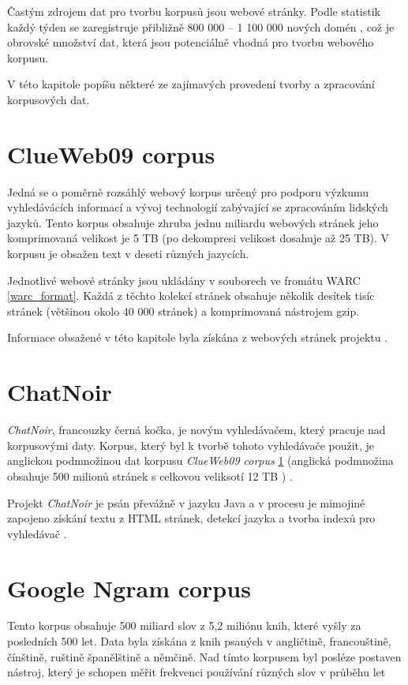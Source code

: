 Častým zdrojem dat pro tvorbu korpusů jsou webové stránky. Podle statistik
každý týden se zaregistruje přibližně 800 000 -- 1 100 000 nových domén \cite{NEWPAGES},
což je obrovské množství dat, která jsou potenciálně vhodná pro tvorbu webového korpusu.

V této kapitole popíšu některé ze zajímavých provedení tvorby a zpracování korpusových dat.

\section{ClueWeb09 corpus}
\label{ClueWeb09}
Jedná se o poměrně rozsáhlý webový korpus určený pro podporu výzkumu vyhledávácích informací
a vývoj technologií zabývající se zpracováním lidských jazyků. Tento korpus obsahuje zhruba
jednu miliardu webových stránek jeho komprimovaná velikost je 5 TB (po dekompresi velikost
dosahuje až 25 TB). V korpusu je obsažen text v deseti různých jazycích.

Jednotlivé webové stránky jsou ukládány v souborech ve fromátu WARC \ref{warc_format}.
Každá z těchto kolekcí stránek obsahuje několik desítek tisíc stránek (většinou okolo 40 000 stránek) a komprimovaná
nástrojem gzip.

Informace obsažené v této kapitole byla získána z webových stránek projektu \cite{CLUEWEB}.

\section{ChatNoir}
\textit{ChatNoir}, francouzky černá kočka, je novým vyhledávačem, který pracuje nad korpusovými daty. Korpus,
který byl k tvorbě tohoto vyhledávače použit, je anglickou podmnožinou dat korpusu \textit{ClueWeb09 corpus}
\ref{ClueWeb09} (anglická podmnožina obsahuje 500 milionů stránek s celkovou veliksotí 12 TB ) \cite{CHATNOIR}.

Projekt \textit{ChatNoir} je psán převážně v jazyku Java a v procesu je mimojiné zapojeno získání textu z
HTML stránek, detekcí jazyka a tvorba indexů pro vyhledávač \cite{CHATNOIR_GIT}.

\section{Google Ngram corpus}
Tento korpus obsahuje 500 miliard slov z 5,2 miliónu knih, které vyšly za posledních 500 let.
Data byla získána z knih psaných v angličtině, francouštině, čínštině, ruštině
španělštině a němčině. Nad tímto korpusem byl posléze postaven nástroj, který
je schopen měřit frekvenci používání různých slov v průběhu let \cite{NGRAM}

